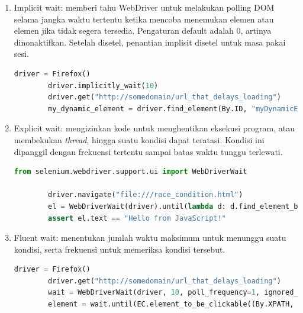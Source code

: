 \begin{enumerate}
	\item Implicit wait: memberi tahu WebDriver untuk melakukan polling DOM selama jangka waktu tertentu ketika mencoba menemukan elemen atau elemen jika tidak segera tersedia. Pengaturan default adalah 0, artinya dinonaktifkan. Setelah disetel, penantian implisit disetel untuk masa pakai sesi.
	\begin{lstlisting}[language=python, caption=Contoh kode Implicit wait, label=kode:2:implicit]
		driver = Firefox()
		driver.implicitly_wait(10)
		driver.get("http://somedomain/url_that_delays_loading")
		my_dynamic_element = driver.find_element(By.ID, "myDynamicElement")
	\end{lstlisting}
	\item Explicit wait: mengizinkan kode untuk menghentikan eksekusi program, atau membekukan \textit{thread}, hingga suatu kondisi dapat teratasi. Kondisi ini dipanggil dengan frekuensi tertentu sampai batas waktu tunggu terlewati.
	\begin{lstlisting}[language=python, caption=Contoh kode Explicit wait, label=kode:2:explicit]
		from selenium.webdriver.support.ui import WebDriverWait
		
		driver.navigate("file:///race_condition.html")
		el = WebDriverWait(driver).until(lambda d: d.find_element_by_tag_name("p"))
		assert el.text == "Hello from JavaScript!"
	\end{lstlisting}
	\item Fluent wait: menentukan jumlah waktu maksimum untuk menunggu suatu kondisi, serta frekuensi untuk memeriksa kondisi tersebut.
	\begin{lstlisting}[language=python, caption=Contoh kode FluentWait, label=kode:2:FluentWait]
		driver = Firefox()
		driver.get("http://somedomain/url_that_delays_loading")
		wait = WebDriverWait(driver, 10, poll_frequency=1, ignored_exceptions=[ElementNotVisibleException, ElementNotSelectableException])
		element = wait.until(EC.element_to_be_clickable((By.XPATH, "//div")))
	\end{lstlisting}
\end{enumerate}










